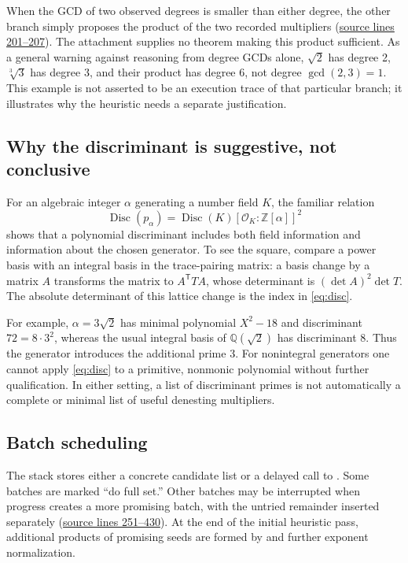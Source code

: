 \documentclass[11pt,letterpaper]{article}
\newcommand{\code}[1]{\texttt{\detokenize{#1}}}
\newcommand{\src}[1]{\hyperref[app:source]{source lines #1}}
\newcommand{\Q}{\mathbb{Q}}
\newcommand{\Z}{\mathbb{Z}}
\DeclareMathOperator{\Disc}{Disc}
\theoremstyle{definition}
\theoremstyle{remark}
\begin{document}
When the GCD of two observed degrees is smaller than either degree, the other
branch simply proposes the product of the two recorded multipliers
(\src{201--207}). The attachment supplies no theorem making this product
sufficient. As a general warning against reasoning from degree GCDs alone,
$\sqrt2$ has degree 2, $\sqrt[3]3$ has degree 3, and their product has degree 6,
not degree $\gcd(2,3)=1$. This example is not asserted to be an execution trace
of that particular branch; it illustrates why the heuristic needs a separate
justification.

\subsection{Why the discriminant is suggestive, not conclusive}
For an algebraic integer $\alpha$ generating a number field $K$, the familiar
relation
\begin{equation}
 \Disc(p_\alpha)=\Disc(K)
 [\mathcal O_K:\Z[\alpha]]^2\label{eq:disc}
\end{equation}
shows that a polynomial discriminant includes both field information and
information about the chosen generator. To see the square, compare a power
basis with an integral basis in the trace-pairing matrix: a basis change by a
matrix $A$ transforms the matrix to $A^{\mathsf T}TA$, whose determinant is
$(\det A)^2\det T$. The absolute determinant of this lattice change is the
index in \eqref{eq:disc}.

For example, $\alpha=3\sqrt2$ has minimal polynomial $X^2-18$ and discriminant
$72=8\cdot3^2$, whereas the usual integral basis of $\Q(\sqrt2)$ has
discriminant 8. Thus the generator introduces the additional prime 3. For
nonintegral generators one cannot apply \eqref{eq:disc} to a primitive,
nonmonic polynomial without further qualification. In either setting, a list
of discriminant primes is not automatically a complete or minimal list of
useful denesting multipliers.

\subsection{Batch scheduling}
The stack stores either a concrete candidate list or a delayed call to
\code{newmultipliers}. Some batches are marked ``do full set.'' Other batches
may be interrupted when progress creates a more promising batch, with the
untried remainder inserted separately (\src{251--430}). At the end of the
initial heuristic pass, additional products of promising seeds are formed by
\code{Distribute} and further exponent normalization.
\end{document}
